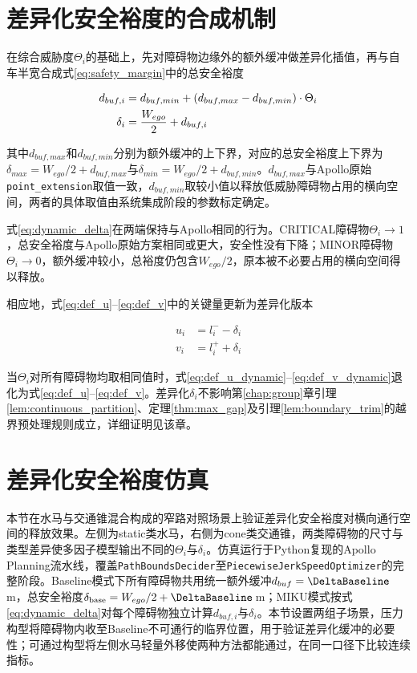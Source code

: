 \section{差异化安全裕度的合成机制}
\label{sec:dynamic_delta_synthesis}
在综合威胁度$\Theta_i$的基础上，先对障碍物边缘外的额外缓冲做差异化插值，再与自车半宽合成式\eqref{eq:safety_margin}中的总安全裕度

\begin{align}
    d_{buf,i} &= d_{buf,min} + (d_{buf,max} - d_{buf,min}) \cdot \Theta_i \notag \\
    \delta_i &= \frac{W_{ego}}{2} + d_{buf,i}
    \label{eq:dynamic_delta}
\end{align}

其中$d_{buf,max}$和$d_{buf,min}$分别为额外缓冲的上下界，对应的总安全裕度上下界为$\delta_{max} = W_{ego}/2 + d_{buf,max}$与$\delta_{min} = W_{ego}/2 + d_{buf,min}$。$d_{buf,max}$与Apollo原始\texttt{point\_extension}取值一致，$d_{buf,min}$取较小值以释放低威胁障碍物占用的横向空间，两者的具体取值由系统集成阶段的参数标定确定。

式\eqref{eq:dynamic_delta}在两端保持与Apollo相同的行为。CRITICAL障碍物$\Theta_i \to 1$，总安全裕度与Apollo原始方案相同或更大，安全性没有下降；MINOR障碍物$\Theta_i \to 0$，额外缓冲较小，总裕度仍包含$W_{ego}/2$，原本被不必要占用的横向空间得以释放。

相应地，式\eqref{eq:def_u}--\eqref{eq:def_v}中的关键量更新为差异化版本

\begin{align}
    u_i &= l_i^{-} - \delta_i \label{eq:def_u_dynamic} \\
    v_i &= l_i^{+} + \delta_i \label{eq:def_v_dynamic}
\end{align}

当$\Theta_i$对所有障碍物均取相同值时，式\eqref{eq:def_u_dynamic}--\eqref{eq:def_v_dynamic}退化为式\eqref{eq:def_u}--\eqref{eq:def_v}。差异化$\delta_i$不影响第\ref{chap:group}章引理\ref{lem:continuous_partition}、定理\ref{thm:max_gap}及引理\ref{lem:boundary_trim}的越界预处理规则成立，详细证明见该章。

\section{差异化安全裕度仿真}
\label{sec:exp_ch4}

本节在水马与交通锥混合构成的窄路对照场景上验证差异化安全裕度对横向通行空间的释放效果。左侧为static类水马，右侧为cone类交通锥，两类障碍物的尺寸与类型差异使多因子模型输出不同的$\Theta_i$与$\delta_i$。仿真运行于Python复现的Apollo Planning流水线，覆盖\texttt{PathBoundsDecider}至\texttt{PiecewiseJerkSpeedOptimizer}的完整阶段。Baseline模式下所有障碍物共用统一额外缓冲$d_{buf}=\DeltaBaseline$\,m，总安全裕度$\delta_{\mathrm{base}}=W_{ego}/2+\DeltaBaseline$\,m；MIKU模式按式\eqref{eq:dynamic_delta}对每个障碍物独立计算$d_{buf,i}$与$\delta_i$。本节设置两组子场景，压力构型将障碍物内收至Baseline不可通行的临界位置，用于验证差异化缓冲的必要性；可通过构型将左侧水马轻量外移使两种方法都能通过，在同一口径下比较连续指标。

